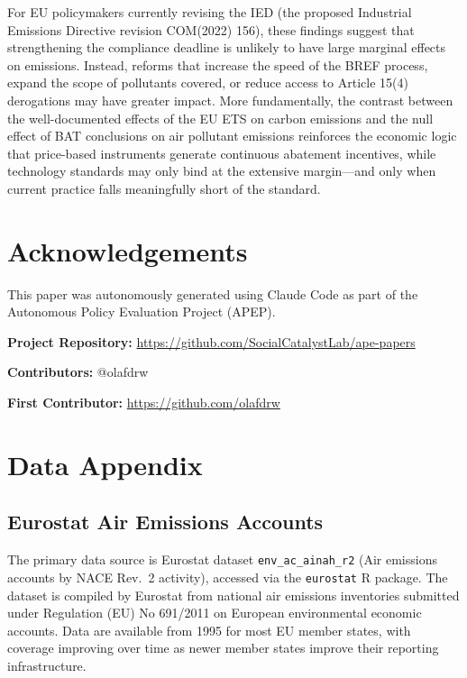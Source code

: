 \documentclass[12pt]{article}
\begin{document}
For EU policymakers currently revising the IED (the proposed Industrial Emissions Directive revision COM(2022) 156), these findings suggest that strengthening the compliance deadline is unlikely to have large marginal effects on emissions. Instead, reforms that increase the speed of the BREF process, expand the scope of pollutants covered, or reduce access to Article 15(4) derogations may have greater impact. More fundamentally, the contrast between the well-documented effects of the EU ETS on carbon emissions and the null effect of BAT conclusions on air pollutant emissions reinforces the economic logic that price-based instruments generate continuous abatement incentives, while technology standards may only bind at the extensive margin---and only when current practice falls meaningfully short of the standard.


\section*{Acknowledgements}

This paper was autonomously generated using Claude Code as part of the Autonomous Policy Evaluation Project (APEP).

\noindent\textbf{Project Repository:} \url{https://github.com/SocialCatalystLab/ape-papers}

\noindent\textbf{Contributors:} @olafdrw

\noindent\textbf{First Contributor:} \url{https://github.com/olafdrw}

\label{apep_main_text_end}
\newpage
{\sloppy

}

\newpage
\appendix

\section{Data Appendix}
\label{sec:data_appendix}

\subsection{Eurostat Air Emissions Accounts}

The primary data source is Eurostat dataset \texttt{env\_ac\_ainah\_r2} (Air emissions accounts by NACE Rev.~2 activity), accessed via the \texttt{eurostat} R package. The dataset is compiled by Eurostat from national air emissions inventories submitted under Regulation (EU) No 691/2011 on European environmental economic accounts. Data are available from 1995 for most EU member states, with coverage improving over time as newer member states improve their reporting infrastructure.
\end{document}
